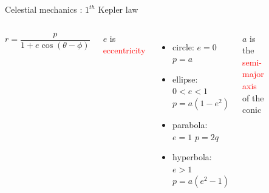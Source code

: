 \documentclass{beamer}
\begin{document}
\begin{frame}{Celestial mechanics \cite{murray1999solar}: $1^{th}$ Kepler law}
\begin{columns}
\begin{equation}
r=\dfrac{p}{1+e\cos(\theta-\phi)}
\end{equation}


\begin{center}
$e$ is \textcolor{red}{eccentricity}
\end{center}

\begin{itemize}
\item circle:  $e=0$ \quad $p=a$
\item ellipse: $0<e<1$ \quad $p=a(1-e^{2})$
\item parabola: $e=1$ \quad $p=2q$
\item hyperbola: $e>1$ \quad $p=a(e^{2}-1)$
\end{itemize}
\begin{center}
$a$ is the  \textcolor{red}{semi-major axis} of the conic
\end{center}
\begin{figure}[h]
\begin{center}
\includegraphics[width=\textwidth]{Pic/Conics.png}
\caption{\cite{murray1999solar}}
\label{Area_dynamics}
\end{center}
\end{figure}

\end{columns}
\end{frame}
\end{document}
